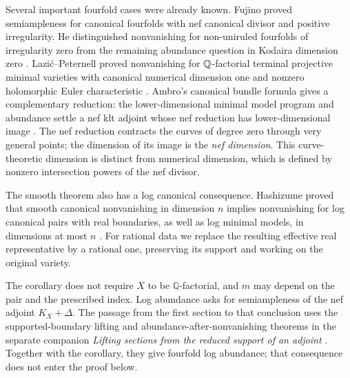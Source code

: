 Several important fourfold cases were already known. Fujino proved
semiampleness for canonical fourfolds with nef canonical divisor and
positive irregularity. He distinguished nonvanishing for non-uniruled
fourfolds of irregularity zero from the remaining abundance question
in Kodaira dimension zero
\cite[Corollary~4.7 and Problems~4.10--4.11]{Fujino2010}.
Lazi\'c--Peternell proved nonvanishing for $\mathbb Q$-factorial terminal projective minimal
varieties with canonical numerical dimension one and nonzero
holomorphic Euler characteristic
\cite[Theorem~6.7]{LazicPeternell2018}.
Ambro's canonical bundle formula gives a complementary reduction:
the lower-dimensional minimal model program and abundance settle a
nef klt adjoint whose nef reduction has lower-dimensional image
\cite[Theorem~4.3]{Ambro2005}. The nef reduction contracts the curves
of degree zero through very general points; the dimension of its image
is the \emph{nef dimension}. This curve-theoretic dimension is distinct
from numerical dimension, which is defined by nonzero intersection
powers of the nef divisor.

The smooth theorem also has a log canonical consequence. Hashizume
proved that smooth canonical nonvanishing in dimension $n$ implies
nonvanishing for log canonical pairs with real boundaries, as well as
log minimal models, in dimensions at most $n$
\cite[Theorem~1.4]{Hashizume2018}. For rational data we replace the
resulting effective real representative by a rational one, preserving
its support and working on the original variety.


The corollary does not require $X$ to be $\mathbb Q$-factorial, and
$m$ may depend on the pair and the prescribed index. Log abundance
asks for semiampleness of the nef adjoint $K_X+\Delta$. The passage
from the first section to that conclusion uses the supported-boundary
lifting and abundance-after-nonvanishing theorems in the separate
companion \emph{Lifting sections from the reduced support of an adjoint}
\cite[Theorems~1.1--1.2]{OpenAIBoundary2026}.
Together with the corollary, they give fourfold log abundance; that
consequence does not enter the proof below.

